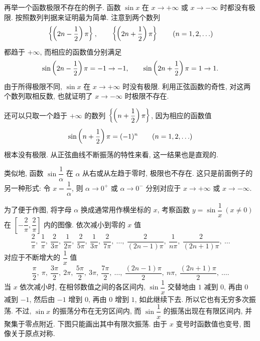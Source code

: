 \label{ex:oscillating_sine_no_limit}
再举一个函数极限不存在的例子. 函数 $\sin x$ 在
$x\to+\infty$ 或 $x\to-\infty$ 时都没有极限.
按照数列判据来证明最为简单. 注意到两个数列
$$
\left\{ \left( 2n-\frac12 \right)\pi \right\},
\qquad
\left\{ \left( 2n+\frac12 \right)\pi \right\}\qquad(n=1,2,\ldots)
$$
都趋于 $+\infty$, 而相应的函数值分别满足
$$
\sin\left( 2n-\frac12 \right)\pi=-1\to-1,
\qquad
\sin\left( 2n+\frac12 \right)\pi=1\to1.
$$
由于所得极限不同, $\sin x$ 在 $x\to+\infty$ 时没有极限.
利用正弦函数的奇性, 对这两个数列取相反数,
也就证明了 $x\to-\infty$ 时极限不存在.

还可以只取一个趋于 $+\infty$ 的数列
$\left\{ \left( n+\dfrac12 \right)\pi \right\}$, 因为相应的函数值
$$
\sin\left( n+\frac12 \right)\pi=(-1)^n\qquad(n=1,2,\ldots)
$$
根本没有极限. 从正弦曲线不断振荡的特性来看, 这一结果也是直观的.

类似地, 函数 $\sin\dfrac1\alpha$ 在 $\alpha$ 从右或从左趋于零时,
极限也不存在. 这只是前面例子的另一种形式:
令 $x=\dfrac1\alpha$, 则 $\alpha\to0^+$ 或 $\alpha\to0^-$
分别对应于 $x\to+\infty$ 或 $x\to-\infty$.

为了便于作图, 将字母 $\alpha$ 换成通常用作横坐标的 $x$,
考察函数 $y=\sin\dfrac1x\ (x\ne0)$ 在
$\left[-\dfrac2\pi,\dfrac2\pi\right]$ 内的图像.
依次减小到零的 $x$ 值
$$
\frac2\pi,\ \frac1\pi,\ \frac2{3\pi},\ \frac1{2\pi},\
\frac2{5\pi},\ \frac1{3\pi},\ \frac2{7\pi},\ \ldots,\
\frac2{(2n-1)\pi},\ \frac1{n\pi},\ \frac2{(2n+1)\pi},\ \ldots
$$
对应于不断增大的 $\dfrac1x$ 值
$$
\frac\pi2,\ \pi,\ \frac{3\pi}2,\ 2\pi,\ \frac{5\pi}2,\
3\pi,\ \frac{7\pi}2,\ \ldots,\
\frac{(2n-1)\pi}2,\ n\pi,\ \frac{(2n+1)\pi}2,\ \ldots.
$$
当 $x$ 依次减小时, 在相邻数值之间的各区间内,
$\sin\dfrac1x$ 交替地由 $1$ 减到 $0$, 再由 $0$ 减到 $-1$,
然后由 $-1$ 增到 $0$, 再由 $0$ 增到 $1$, 如此继续下去.
所以它也有无穷多次振荡. 不过, $\sin x$ 的振荡分布在无穷区间内,
而 $\sin\dfrac1x$ 的振荡出现在有限区间内, 并聚集于零点附近.
下图只能画出其中有限次振荡.
由于 $x$ 变号时函数值也变号, 图像关于原点对称.

